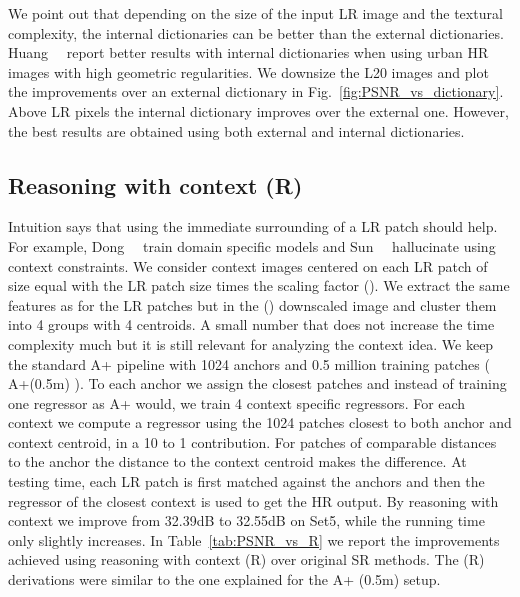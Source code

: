 \documentclass[10pt,twocolumn,letterpaper]{article}
\begin{document}
We point out that depending on the size of the input LR image and the textural complexity, the internal dictionaries can be better than the external dictionaries. Huang~\etal~\cite{Huang-CVPR-2015} report better results with internal dictionaries when using urban HR images with high geometric regularities.
We downsize the L20 images and plot the improvements over an external dictionary in Fig.~\ref{fig:PSNR_vs_dictionary}. Above  LR pixels the internal dictionary improves over the external one. However, the best results are obtained using both external and internal dictionaries.

\subsection{Reasoning with context (R)}
\label{ssc:context}
Intuition says that using the immediate surrounding of a LR patch should help. For example, Dong~\etal~\cite{Dong-TIP-2011} train domain specific models and Sun~\etal~\cite{Sun-CVPR-2010} hallucinate using context constraints.
We consider context images centered on each LR patch of size equal with the LR patch size times the scaling factor ().
We extract the same features as for the LR patches but in the () downscaled image and cluster them into 4 groups with 4 centroids. A small number that does not increase the time complexity much but it is still relevant for analyzing the context idea. 
We keep the standard A+ pipeline with 1024 anchors and 0.5 million training patches ( A+(0.5m) ). To each anchor we assign the closest patches and instead of training one regressor as A+ would, we train 4 context specific regressors. For each context we compute a regressor using the 1024 patches closest to both anchor and context centroid, in a 10 to 1 contribution. For patches of comparable distances to the anchor the distance to the context centroid makes the difference.
At testing time, each LR patch is first matched against the anchors and then the regressor of the closest context is used to get the HR output.
By reasoning with context we improve from 32.39dB to 32.55dB on Set5, while the running time only slightly increases. 
In Table~\ref{tab:PSNR_vs_R} we report the improvements achieved using reasoning with context (R) over original SR methods. The (R) derivations were similar to the one explained for the A+ (0.5m) setup.
\end{document}
